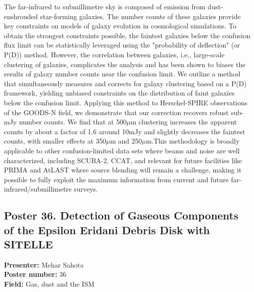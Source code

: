 The far-infrared to submillimetre sky is composed of emission from dust-enshrouded star-forming galaxies. The number counts of these galaxies provide key constraints on models of galaxy evolution in cosmological simulations. To obtain the strongest constraints possible, the faintest galaxies below the confusion flux limit can be statistically leveraged using the "probability of deflection" (or P(D)) method. However, the correlation between galaxies, i.e., large-scale clustering of galaxies, complicates the analysis and has been shown to biases the results of galaxy number counts near the confusion limit. We outline a method that simultaneously measures and corrects for galaxy clustering based on a P(D) framework, yielding unbiased constraints on the distribution of faint galaxies below the confusion limit. Applying this method to Herschel-SPIRE observations of the GOODS-N field, we demonstrate that our correction recovers robust sub-mJy number counts. We find that at 500$\mu$m clustering increases the apparent counts by about a factor of 1.6 around 10mJy and slightly decreases the faintest counts, with smaller effects at 350$\mu$m and 250$\mu$m.This methodology is broadly applicable to other confusion-limited data sets where beams and noise are well characterized, including SCUBA-2, CCAT, and relevant for future facilities like PRIMA and AtLAST where source blending will remain a challenge, making it possible to fully exploit the maximum information from current and future far-infrared/submillimetre surveys.

\hypertarget{poster-abstract-talk-205}{}\label{poster-abstract-page-talk-205}
\subsection*{Poster 36. Detection of Gaseous Components of the Epsilon Eridani Debris Disk with SITELLE}
\textbf{Presenter:} Mehar Sahota\\
\textbf{Poster number:} 36\\
\textbf{Field:} Gas, dust and the ISM

